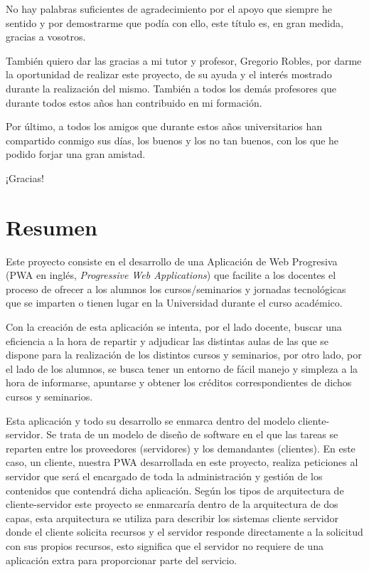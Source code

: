 \documentclass[a4paper, 12pt]{book}
\begin{document}
	No hay palabras suficientes de agradecimiento por el apoyo que siempre he sentido y por demostrarme que podía con ello, este título es, en gran medida, gracias a vosotros.

	También quiero dar las gracias a mi tutor y profesor, Gregorio Robles, por darme la oportunidad de realizar este proyecto, de su ayuda y el interés mostrado durante la realización del mismo.
También a todos los demás profesores que durante todos estos años han contribuido en mi formación.

	Por último, a todos los amigos que durante estos años universitarios han compartido conmigo sus días, los buenos y los no tan buenos, con los que he podido forjar una gran amistad.

	\vspace{5mm} %
	¡Gracias!



\chapter*{Resumen}

	Este proyecto consiste en el desarrollo de una Aplicación de Web Progresiva (PWA en inglés, \emph{Progressive Web Applications}) que facilite a los docentes el proceso de ofrecer a los alumnos los cursos/seminarios y jornadas tecnológicas que se imparten o tienen lugar en la Universidad durante el curso académico.

	Con la creación de esta aplicación se intenta, por el lado docente, buscar una eficiencia a la hora de repartir y adjudicar las distintas aulas de las que se dispone para la realización de los distintos cursos y seminarios, por otro lado, por el lado de los alumnos, se busca tener un entorno de fácil manejo y simpleza a la hora de informarse, apuntarse y obtener los créditos correspondientes de dichos cursos y seminarios.
	
	Esta aplicación y todo su desarrollo se enmarca dentro del modelo cliente-servidor. Se trata de un modelo de diseño de software en el que las tareas se reparten entre los proveedores (servidores) y los demandantes (clientes). En este caso, un cliente, nuestra PWA desarrollada en este proyecto, realiza peticiones al servidor que será el encargado de toda la administración y gestión de los contenidos que contendrá dicha aplicación. Según los tipos de arquitectura de cliente-servidor este proyecto se enmarcaría dentro de la arquitectura de dos capas, esta arquitectura se utiliza para describir los sistemas cliente servidor donde el cliente solicita recursos y el servidor responde directamente a la solicitud con sus propios recursos, esto significa que el servidor no requiere de una aplicación extra para proporcionar parte del servicio.
	
\end{document}

